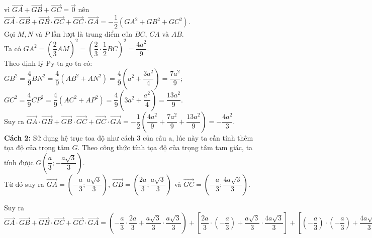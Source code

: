 \begin{vd}
{\begin{enumerate}
			vì $ \overrightarrow{GA}+\overrightarrow{GB}+\overrightarrow{GC}=\overrightarrow{0} $ nên $ \overrightarrow{GA}\cdot \overrightarrow{GB} + \overrightarrow{GB}\cdot \overrightarrow{GC} + \overrightarrow{GC}\cdot \overrightarrow{GA}=-\dfrac{1}{2}\left(GA^2+GB^2+GC ^2 \right) $.\\
			Gọi $ M, N $ và $ P $ lần lượt là trung điểm của $ BC $, $ CA $ và $ AB $.\\
			Ta có $ GA^2=\left( \dfrac{2}{3}AM \right)^2=\left( \dfrac{2}{3}\cdot \dfrac{1}{2}BC \right)^2=\dfrac{4a^2}{9}  $.\\
			Theo định lý Py-ta-go ta có:\\
			$ GB^2=\dfrac{4}{9}BN^2=\dfrac{4}{9}\left( AB^2+AN^2 \right)=\dfrac{4}{9}\left (a^2+\dfrac{3a^2}{4}\right )=\dfrac{7a^2}{9}  $;\\
			$ GC^2=\dfrac{4}{9}CP^2=\dfrac{4}{9}\left( AC^2+AP^2 \right)=\dfrac{4}{9}\left (3a^2+\dfrac{a^2}{4}\right )=\dfrac{13a^2}{9} $.\\
			Suy ra $ \overrightarrow{GA}\cdot \overrightarrow{GB} + \overrightarrow{GB}\cdot \overrightarrow{GC} + \overrightarrow{GC}\cdot \overrightarrow{GA}=-\dfrac{1}{2}\left (\dfrac{4a^2}{9}+\dfrac{7a^2}{9}+\dfrac{13a^2}{9}\right )=-\dfrac{4a^2}{3} $.\\
			\textbf{Cách 2:} Sử dụng hệ trục toa độ như cách 3 của câu a, lúc này ta cần tính thêm tọa độ của trọng tâm $ G $. Theo công thức tính tọa độ của trọng tâm tam giác, ta tính được $ G\left (\dfrac{a}{3};-\dfrac{a\sqrt{3}}{3}\right ) $.\\
			Từ đó suy ra $ \overrightarrow{GA}=\left (-\dfrac{a}{3};\dfrac{a\sqrt{3}}{3}\right ) $, $ \overrightarrow{GB}=\left (\dfrac{2a}{3};\dfrac{a\sqrt{3}}{3}\right ) $ và $ \overrightarrow{GC}=\left (-\dfrac{a}{3};\dfrac{4a\sqrt{3}}{3}\right ) $.
			\begin{flushleft}
				Suy ra $ \overrightarrow{GA}\cdot \overrightarrow{GB} + \overrightarrow{GB}\cdot \overrightarrow{GC} + \overrightarrow{GC}\cdot \overrightarrow{GA}=\left (-\dfrac{a}{3}\cdot \dfrac{2a}{3}+\dfrac{a\sqrt{3}}{3}\cdot \dfrac{a\sqrt{3}}{3}\right )+\left [\dfrac{2a}{3}\cdot \left( -\dfrac{a}{3} \right) + \dfrac{a\sqrt{3}}{3}\cdot \dfrac{4a\sqrt{3}}{3}\right ]+ \left [\left( -\dfrac{a}{3} \right) \cdot \left(-\dfrac{a}{3} \right) +\dfrac{4a\sqrt{3}}{3}\cdot \dfrac{a\sqrt{3}}{3}\right ]=-\dfrac{4a^2}{3}. $
			\end{flushleft} 
		\end{enumerate}
	}
\end{vd}

